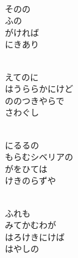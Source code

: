 \documentclass[10pt,b5j]{tarticle} %
\begin{document}
\begin{enumerate}
\begin{minipage}[c]{\blocksize}
        \vspace{\linespace}
        \item~\\
        そのの\\
        ふの\\
        がければ\\
        にきあり
        
    \end{minipage}
    \begin{minipage}[c]{\blocksize}
        
        \vspace{\linespace}
        \item~\\
        えてのに\\
        はうららかにけど\\
        ののつきやらで\\
        さわぐし
        
    \end{minipage}
    \begin{minipage}[c]{\blocksize}
        
        \vspace{\linespace}
        \item~\\
        にるるの\\
        もらむシベリアの\\
        がをひては\\
        けきのらずや
        
    \end{minipage}
    \begin{minipage}[c]{\blocksize}
        
        \vspace{\linespace}
        \item~\\
        ふれも\\
        みてかむわが\\
        はろけきにけば\\
        はやしの
        

\end{minipage}
\end{enumerate}
\end{document}
